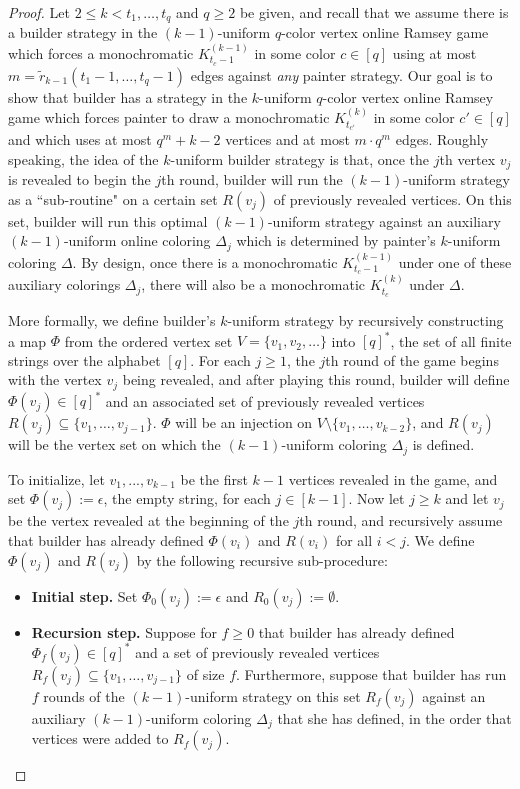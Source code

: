 \documentclass[10pt,a4paper]{amsart}
\def\e{\epsilon}
\begin{document}
\begin{proof}
Let $2 \leq k < t_1, \dots, t_q$ and $q \geq 2$ be given, and recall that we assume there is a builder strategy in the $(k-1)$-uniform $q$-color vertex online Ramsey game which forces a
monochromatic $K_{t_c-1}^{(k-1)}$ in some color $c \in [q]$ using
at most $m = \tilde{r}_{k-1}(t_1-1,\dots, t_q-1)$ edges against {\it any} painter strategy.
Our goal is to show that builder has a strategy in the $k$-uniform $q$-color vertex online Ramsey game which forces painter to draw a
monochromatic $K_{t_{c'}}^{(k)}$ in some color $c' \in [q]$
and which uses at most $q^m + k-2$ vertices and at most $m \cdot q^m$ edges.
Roughly speaking, the idea of the $k$-uniform builder strategy is that, once the $j$th vertex $v_j$ is revealed to begin the $j$th round, builder will run the $(k-1)$-uniform strategy as a ``sub-routine" on a certain set $R(v_j)$ of previously revealed vertices.
On this set, builder will run this optimal $(k-1)$-uniform strategy against an auxiliary $(k-1)$-uniform online coloring $\Delta_j$ which is determined by painter's $k$-uniform coloring $\Delta$.
By design, once there is a monochromatic $K_{t_c-1}^{(k-1)}$ under one of these auxiliary colorings $\Delta_j$, there will also be a monochromatic $K_{t_c}^{(k)}$ under $\Delta$.

More formally, we define builder's $k$-uniform strategy by recursively constructing a map $\Phi$ from the ordered vertex set $V = \{v_1, v_2, \dots\}$ into 
$[q]^*$, the set of all finite strings over the alphabet $[q]$.
For each $j \geq 1$, the $j$th round of the game begins with the vertex $v_j$ being revealed, and after playing this round, builder will define $\Phi(v_j) \in [q]^*$ and an associated set of previously revealed vertices $R(v_j) \subseteq \{v_1, \dots, v_{j-1}\}$.
$\Phi$ will be an injection on $V \setminus \{v_1, \dots, v_{k-2}\}$, and $R(v_j)$ will be the vertex set on which the $(k-1)$-uniform coloring $\Delta_j$ is defined.

To initialize, let $v_1, ..., v_{k-1}$ be the first $k-1$ vertices revealed in the game, and set
$\Phi(v_j) := \e$, the empty string, for each $j \in [k-1]$.
Now let $j \geq k$ and let $v_j$ be the vertex revealed at the beginning of the $j$th round, and recursively assume that builder has already defined $\Phi(v_i)$ and $R(v_i)$ for all $i < j$.
We define $\Phi(v_j)$ and $R(v_j)$ by the following recursive sub-procedure:
\begin{itemize}
    \item {\bf Initial step.} Set $\Phi_0(v_j) := \e$ and $R_0(v_j) := \emptyset$.
    \item {\bf Recursion step.} Suppose for $f \geq 0$ that builder has already defined $\Phi_f(v_j) \in [q]^*$ and a set of previously revealed vertices $R_f(v_j) \subseteq \{v_1, \dots, v_{j-1}\}$ of size $f$.
    Furthermore, suppose that builder has run $f$ rounds of the $(k-1)$-uniform strategy on this set $R_f(v_j)$ against an auxiliary $(k-1)$-uniform coloring $\Delta_j$ that she has defined, in the order that vertices were added to $R_f(v_j)$.
    

\end{itemize}
\end{proof}
\end{document}
